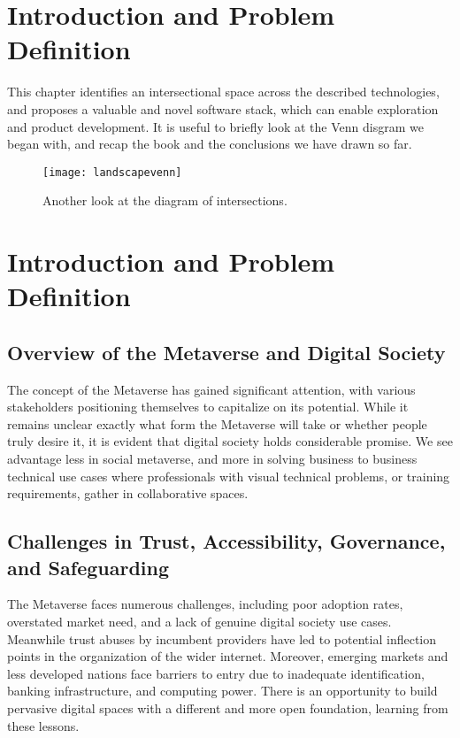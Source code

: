 \section{Introduction and Problem Definition}

This chapter identifies an intersectional space across the described technologies, and proposes a valuable and novel software stack, which can enable exploration  and product development. It is useful to briefly look at the Venn disgram we began with, and recap the book and the conclusions we have drawn so far.

\begin{figure*}[ht]\centering %
	\texttt{[image: landscapevenn]}
	\caption{Another look at the diagram of intersections.}
	\label{fig:landscapevenn}
\end{figure*}


\section{Introduction and Problem Definition}
\subsection{Overview of the Metaverse and Digital Society}
The concept of the Metaverse has gained significant attention, with various stakeholders positioning themselves to capitalize on its potential. While it remains unclear exactly what form the Metaverse will take or whether people truly desire it, it is evident that digital society holds considerable promise. We see advantage less in social metaverse, and more in solving business to business technical use cases where professionals with visual technical problems, or training requirements, gather in collaborative spaces.

\subsection{Challenges in Trust, Accessibility, Governance, and Safeguarding}
The Metaverse faces numerous challenges, including poor adoption rates, overstated market need, and a lack of genuine digital society use cases. Meanwhile trust abuses by incumbent providers have led to potential inflection points in the organization of the wider internet. Moreover, emerging markets and less developed nations face barriers to entry due to inadequate identification, banking infrastructure, and computing power. There is an opportunity to build pervasive digital spaces with a different and more open foundation, learning from these lessons.

